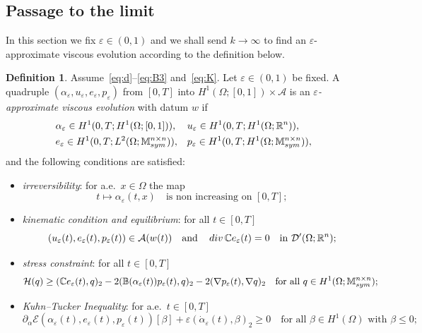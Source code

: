 \documentclass[reqno]{amsart}
\theoremstyle{definition}
\newtheorem{definition}[corollary]{Definition}
\numberwithin{equation}{section}
\def\div {\mathop {\rm div}\nolimits}
\def\R {\mathbb R}
\def\M {\mathbb M^{n\times n}_{\rm sym}}
\def\C {\mathbb C}
\def\B {\mathbb B}
\begin{document}
\subsection{Passage to the limit}

In this section we fix $\varepsilon\in (0,1)$ and we shall send $k\to\infty$ to find an $\varepsilon$-approximate viscous evolution according to the definition below.

\begin{definition}\label{def:ep_QSE}
Assume~\eqref{eq:d}--\eqref{eq:B3} and~\eqref{eq:K}. Let $\varepsilon\in(0,1)$ be fixed. A quadruple $(\alpha_\varepsilon,u_\varepsilon,e_\varepsilon,p_\varepsilon)$ from $[0,T]$ into $H^1(\Omega;[0,1])\times\mathcal A$ is an {\it $\varepsilon$-approximate viscous evolution} with datum $w$ if
\begin{align}
&\alpha_\varepsilon\in H^1(0,T;H^1(\Omega;[0,1])),& & u_\varepsilon \in H^1(0,T;H^1(\Omega;\R^n)),\label{eq:ve_2eg1}\\
&e_\varepsilon \in H^1(0,T;L^2(\Omega;\M)),& & p_\varepsilon \in H^1(0,T;H^1(\Omega;\M))\label{eq:ve_2eg2},
\end{align}
and the following conditions are satisfied:
\begin{itemize}
\item[$(ev0)_\varepsilon$] {\it irreversibility}: for a.e.\ $x\in\Omega$ the map
\begin{equation*}
t\mapsto \alpha_\varepsilon(t,x)\quad\text{is non increasing on $[0,T]$};
\end{equation*}
\item[$(ev1)_\varepsilon$] {\it kinematic condition and equilibrium}: for all $t\in[0,T]$ 
\begin{equation*} 
(u_\varepsilon(t),e_\varepsilon(t),p_\varepsilon(t))\in \mathcal A(w(t))\quad\text{and}\quad\div \C e_\varepsilon(t)=0\quad\text{in $\mathcal D'(\Omega;\R^n)$};
\end{equation*}
\item[$(ev2)_\varepsilon$] {\it stress constraint}: for all $t\in[0,T]$
\begin{equation*}
\mathcal H(q)\ge (\C e_\varepsilon(t),q)_2-2(\B(\alpha_\varepsilon(t))p_\varepsilon(t),q)_2-2(\nabla p_\varepsilon(t),\nabla q)_2\quad\text{for all $q\in H^1(\Omega;\M)$};
\end{equation*}
\item[$(ev3)_\varepsilon$] {\it Kuhn–Tucker Inequality}: for a.e.\ $t\in[0,T]$
\begin{equation*}\partial_\alpha\mathcal E(\alpha_\varepsilon(t),e_\varepsilon(t),p_\varepsilon(t))[\beta]+\varepsilon(\dot\alpha_\varepsilon(t),\beta)_2\ge0\quad\text{for all $\beta\in H^1(\Omega)$ with $\beta \le 0$}; \end{equation*}

\end{itemize}
\end{definition}
\end{document}

